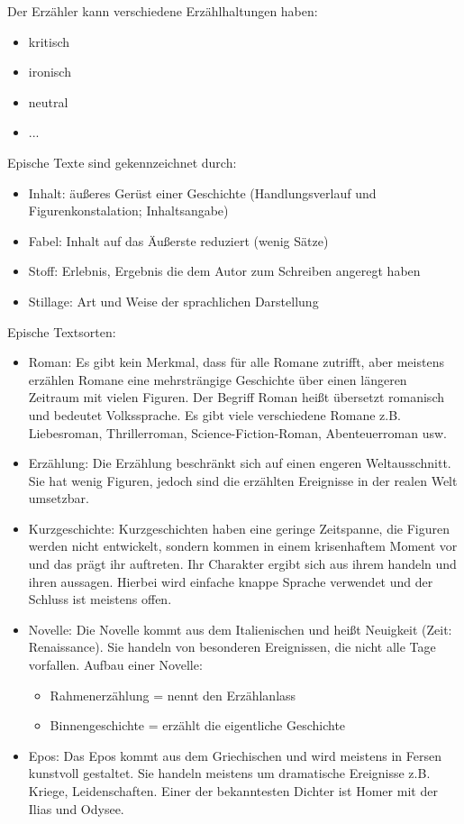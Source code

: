 \documentclass[12pt,a4paper]{article}
\begin{document}
Der Erzähler kann verschiedene Erzählhaltungen haben:

	\begin{itemize}
	\item kritisch
	\item ironisch
	\item neutral
	\item ...
	\end{itemize}

Epische Texte sind gekennzeichnet durch:

	\begin{itemize}
	\item Inhalt: äußeres Gerüst einer Geschichte (Handlungsverlauf und Figurenkonstalation; Inhaltsangabe)
	\item Fabel: Inhalt auf das Äußerste reduziert (wenig Sätze)
	\item Stoff: Erlebnis, Ergebnis die dem Autor zum Schreiben angeregt haben
	\item Stillage: Art und Weise der sprachlichen Darstellung 
	\end{itemize}	
	
Epische Textsorten:

	\begin{itemize}
	\item Roman: Es gibt kein Merkmal, dass für alle Romane zutrifft, aber meistens erzählen Romane eine mehrsträngige Geschichte über
	einen längeren Zeitraum mit vielen Figuren. Der Begriff Roman heißt übersetzt romanisch und bedeutet Volkssprache. Es gibt viele verschiedene
	Romane z.B. Liebesroman, Thrillerroman, Science-Fiction-Roman, Abenteuerroman usw.
	\item Erzählung: Die Erzählung beschränkt sich auf einen engeren Weltausschnitt. Sie hat wenig Figuren, jedoch sind die erzählten Ereignisse in
	der realen Welt umsetzbar.
	\item Kurzgeschichte: Kurzgeschichten haben eine geringe Zeitspanne, die Figuren werden nicht entwickelt, sondern kommen in einem krisenhaftem
	Moment vor und das prägt ihr auftreten. Ihr Charakter ergibt sich aus ihrem handeln und ihren aussagen. Hierbei wird einfache knappe Sprache 
	verwendet und der Schluss ist meistens offen.
	\item Novelle: Die Novelle kommt aus dem Italienischen und heißt Neuigkeit (Zeit: Renaissance). Sie handeln von besonderen Ereignissen, die nicht
	alle Tage vorfallen. Aufbau einer Novelle:
		\begin{itemize}
		\item Rahmenerzählung = nennt den Erzählanlass
		\item Binnengeschichte = erzählt die eigentliche Geschichte
		\end{itemize}
	\item Epos: Das Epos kommt aus dem Griechischen und wird meistens in Fersen kunstvoll gestaltet. Sie handeln meistens um dramatische 
	Ereignisse z.B. Kriege, Leidenschaften. Einer der bekanntesten Dichter ist Homer mit der Ilias und Odysee.
	\end{itemize}
	
\end{document}
